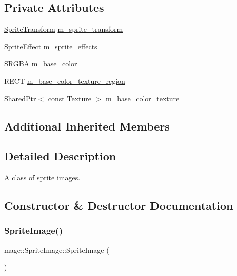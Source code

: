 \subsection*{Private Attributes}
\begin{DoxyCompactItemize}
\item 
\hyperlink{classmage_1_1_sprite_transform}{Sprite\+Transform} \hyperlink{classmage_1_1_sprite_image_aee2dc3f28e26692066fe791b71012929}{m\+\_\+sprite\+\_\+transform}
\item 
\hyperlink{namespacemage_ad62ebdf0e7aae0caf1535a4ea3f056ea}{Sprite\+Effect} \hyperlink{classmage_1_1_sprite_image_acec094202967688a6e368eb44e5950ba}{m\+\_\+sprite\+\_\+effects}
\item 
\hyperlink{structmage_1_1_s_r_g_b_a}{S\+R\+G\+BA} \hyperlink{classmage_1_1_sprite_image_aa83cc38aa8a84e8fc434232b4223c236}{m\+\_\+base\+\_\+color}
\item 
R\+E\+CT \hyperlink{classmage_1_1_sprite_image_a27540b0bee5970d2e978270fe20017ab}{m\+\_\+base\+\_\+color\+\_\+texture\+\_\+region}
\item 
\hyperlink{namespacemage_a1e01ae66713838a7a67d30e44c67703e}{Shared\+Ptr}$<$ const \hyperlink{classmage_1_1_texture}{Texture} $>$ \hyperlink{classmage_1_1_sprite_image_a92f5b052561ca7d8fb317b8479d820a2}{m\+\_\+base\+\_\+color\+\_\+texture}
\end{DoxyCompactItemize}
\subsection*{Additional Inherited Members}


\subsection{Detailed Description}
A class of sprite images. 

\subsection{Constructor \& Destructor Documentation}
\hypertarget{classmage_1_1_sprite_image_aee1a41099068c4037f29e98b7c5d84ae}{}\label{classmage_1_1_sprite_image_aee1a41099068c4037f29e98b7c5d84ae} 
\subsubsection{\texorpdfstring{Sprite\+Image()}{SpriteImage()}\hspace{0.1cm}{\footnotesize\ttfamily [1/3]}}
{\footnotesize\ttfamily mage\+::\+Sprite\+Image\+::\+Sprite\+Image (\begin{DoxyParamCaption}{ }\end{DoxyParamCaption})\hspace{0.3cm}{\ttfamily [noexcept]}}

